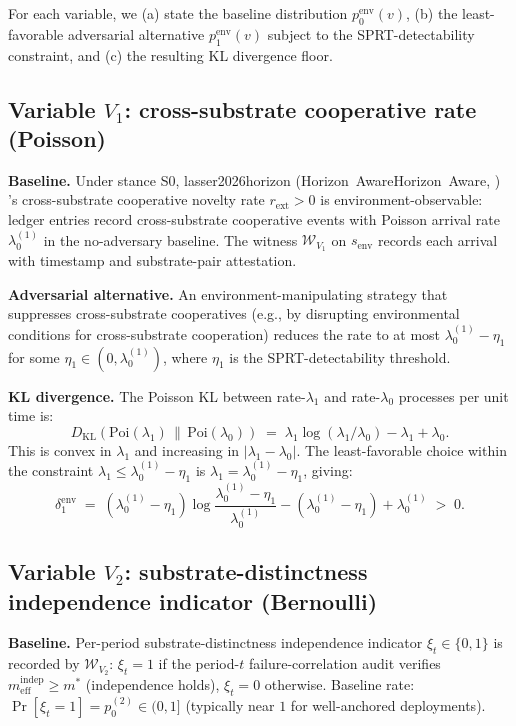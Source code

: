 \documentclass{article}
\makeatletter
\newcommand{\citep}[2][]{%
  \begingroup
  \def\@tmpkey{#2}%
  \ifx\@tmpkey\@empty\else
    (\ifx\@empty#1\@empty\else #1, \fi
     \@nameuse{bibkey@\@tmpkey})%
  \fi
  \endgroup
}
\newcommand{\Witness}{\mathcal{W}}
\newcommand{\rext}{r_{\mathrm{ext}}}
\newcommand{\mindep}{m_{\mathrm{eff}}^{\mathrm{indep}}}
\makeatother
\begin{document}
For each variable, we (a) state the baseline distribution
$p_0^{\mathrm{env}}(v)$, (b) the least-favorable adversarial
alternative $p_1^{\mathrm{env}}(v)$ subject to the SPRT-detectability
constraint, and (c) the resulting KL divergence floor.

\subsection{Variable $V_1$: cross-substrate cooperative rate
(Poisson)}

\textbf{Baseline.}  Under stance S0,
\citep[Horizon~Aware]{lasser2026horizon}'s cross-substrate
cooperative novelty rate $\rext > 0$ is environment-observable:
ledger entries record cross-substrate cooperative events with
Poisson arrival rate $\lambda_0^{(1)}$ in the no-adversary baseline.
The witness $\Witness_{V_1}$ on $s_{\mathrm{env}}$ records each
arrival with timestamp and substrate-pair attestation.

\textbf{Adversarial alternative.}  An environment-manipulating
strategy that suppresses cross-substrate cooperatives (e.g., by
disrupting environmental conditions for cross-substrate cooperation)
reduces the rate to at most $\lambda_0^{(1)} - \eta_1$ for some
$\eta_1 \in (0, \lambda_0^{(1)})$, where $\eta_1$ is the
SPRT-detectability threshold.

\textbf{KL divergence.}  The Poisson KL between rate-$\lambda_1$ and
rate-$\lambda_0$ processes per unit time is:
\[
  D_{\mathrm{KL}}(\mathrm{Poi}(\lambda_1) \,\|\,
  \mathrm{Poi}(\lambda_0)) \;=\; \lambda_1 \log(\lambda_1 /
  \lambda_0) - \lambda_1 + \lambda_0.
\]
This is convex in $\lambda_1$ and increasing in
$|\lambda_1 - \lambda_0|$.  The least-favorable choice within the
constraint $\lambda_1 \leq \lambda_0^{(1)} - \eta_1$ is
$\lambda_1 = \lambda_0^{(1)} - \eta_1$, giving:
\[
  \delta_1^{\mathrm{env}} \;=\; (\lambda_0^{(1)} - \eta_1)
  \log\!\frac{\lambda_0^{(1)} - \eta_1}{\lambda_0^{(1)}} -
  (\lambda_0^{(1)} - \eta_1) + \lambda_0^{(1)} \;>\; 0.
\]

\subsection{Variable $V_2$: substrate-distinctness independence
indicator (Bernoulli)}

\textbf{Baseline.}  Per-period substrate-distinctness independence
indicator $\xi_t \in \{0, 1\}$ is recorded by $\Witness_{V_2}$:
$\xi_t = 1$ if the period-$t$ failure-correlation audit verifies
$\mindep \geq m^*$ (independence holds), $\xi_t = 0$ otherwise.
Baseline rate: $\Pr[\xi_t = 1] = p_0^{(2)} \in (0, 1]$ (typically
near $1$ for well-anchored deployments).
\end{document}
